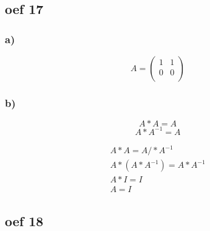 \documentclass[lineaire_algebra_oplossingen.tex]{subfiles}
\begin{document}
\subsection{oef 17}
\subsubsection*{a)}
\[
A= \left(\begin{array} {cc}
    1 & 1\\
    0 & 0\\
\end{array} \right)
\]

\subsubsection*{b)}
\[
A*A=A 
\]
\[
A*A^{-1}=A
\]

\begin{gather*}
A*A=A /*A^{-1}\\
A*(A*A^{-1})=A*A^{-1}\\
A*I=I\\
A=I
\end{gather*}

\subsection{oef 18}
\end{document}
